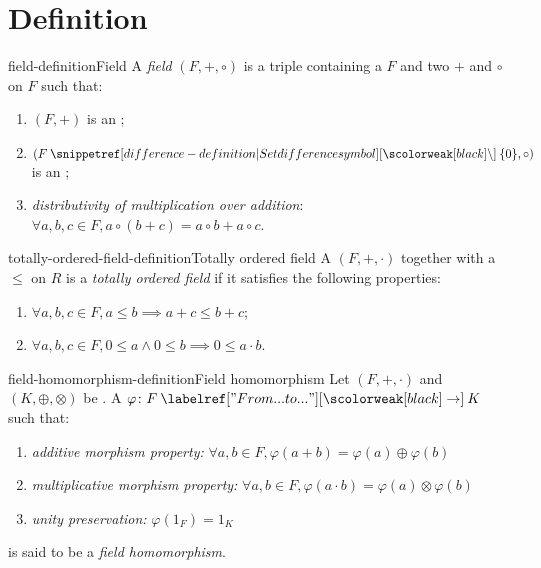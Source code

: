 \documentclass[preview]{standalone}
\begin{document}
\genpage

\section{Definition}

\begin{snippetdefinition}{field-definition}{Field}
    A \textit{field} \((F, +, \circ)\) is a triple containing a \set \(F\) and two 
    \(+\) and \(\circ\) on \(F\) such that:
    \begin{enumerate}
        \item \((F, +)\) is an \abeliangroup;
        \item \((F \difference \{0\}, \circ)\) is an \abeliangroup;
        \item \textit{distributivity of multiplication over addition}:
            \(\forall a,b,c \in F, a\circ (b+c) = a\circ b + a\circ c\).
    \end{enumerate}
\end{snippetdefinition}


\begin{snippetdefinition}{totally-ordered-field-definition}{Totally ordered field}
    A \field \((F, +, \cdot)\) together with a \totalorder \(\leq\) on \(R\) is a
    \textit{totally ordered field} if it satisfies the following properties:
    \begin{enumerate}
        \item \(\forall a,b,c \in F, a \leq b \implies a+c \leq b+c\);
        \item \(\forall a,b,c \in F, 0 \leq a \land 0 \leq b \implies 0 \leq a \cdot b\).
    \end{enumerate}
\end{snippetdefinition}

\begin{snippetdefinition}{field-homomorphism-definition}{Field homomorphism}
    Let \((F, +, \cdot)\) and \((K, \oplus, \otimes)\) be \field[fields].
    A \function \(\varphi\colon F \fromto K\)
    such that:
    \begin{enumerate}
        \item \emph{additive morphism property:} \(\forall a,b \in F, \varphi(a + b) = \varphi(a) \oplus \varphi(b)\)
        \item \emph{multiplicative morphism property:} \(\forall a,b \in F, \varphi(a \cdot b) = \varphi(a) \otimes \varphi(b)\)
        \item \emph{unity preservation:} \(\varphi(1_F) = 1_K\)
    \end{enumerate}
    is said to be a \emph{field homomorphism}.
\end{snippetdefinition}
\end{document}
